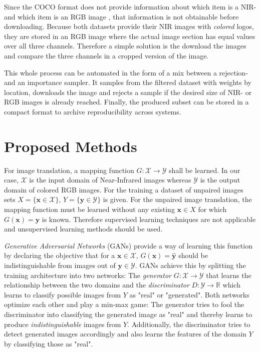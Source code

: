 \documentclass[a4paper,11pt, DIV=12]{scrartcl}
\newcommand{\x}{\boldsymbol{x}}
\newcommand{\y}{\boldsymbol{y}}
\begin{document}
Since the COCO format does not provide information about which item is a NIR- and which item is an RGB image \cite{caltech}, that information is not obtainable before downloading.
Because both datasets provide their NIR images with \textit{colored} logos, they are stored in an RGB image where the actual image section has equal values over all three channels.
Therefore a simple solution is the download the images and compare the three channels in a cropped version of the image.

This whole process can be automated in the form of a mix between a rejection- and an importance sampler. It samples from the filtered dataset with weights by location, downloads the image and
rejects a sample if the desired size of NIR- or RGB images is already reached.
Finally, the produced subset can be stored in a compact format to archive reproducibility across systems.

\section{Proposed Methods}

For image translation, a mapping function $G: \mathcal{X} \to \mathcal{Y}$ shall be learned.
In our case, $\mathcal{X}$ is the input domain of Near-Infrared images whereas $\mathcal{Y}$ is the output domain of colored RGB images.
For the training a dataset of unpaired images sets $X = \{\x \in \mathcal{X}\}$, $Y = \{\y \in \mathcal{Y}\}$ is given.
For the unpaired image translation, the mapping function must be learned without any existing $\x \in X$ for which $G(\x)=\y$ is known.
Therefore supervised learning techniques are not applicable and unsupervised learning methods should be used.

\textit{Generative Adversarial Networks} (GANs) provide a way of learning this function by declaring the objective that for a $\x \in \mathcal{X}$, $G(\x) = \hat{\y}$
should be indistinguishable from images out of $\y \in \mathcal{Y}$. GANs achieve this by splitting the training architecture into two networks:
The \textit{generator} $G: \mathcal{X} \to \mathcal{Y}$ that learns the relationship between the two domains and the \textit{discriminator} $D: \mathcal{Y} \to \mathbb{R}$ which learns to
classify possible images from $Y$ as "real" or "generated".
Both networks optimize each other and play a min-max game:
The generator tries to fool the discriminator into classifying the generated image as "real" and thereby learns to produce \textit{indistinguishable} images from $Y$.
Additionally, the discriminator tries to detect generated images accordingly and also learns the features of the domain $Y$ by classifying those as "real".
\end{document}
